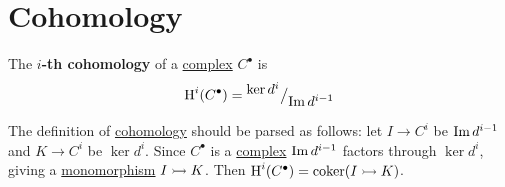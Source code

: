 \documentclass[../../../main]{subfiles}
\begin{document}
\section{Cohomology}
\begin{definition}[Cohomology] \label{def:cohomology}
  The \textbf{\(i\)-th cohomology} of a \hyperref[def:complex]{complex} \(C^{\bullet}\) is
  \begin{align*}
    \operatorname{H}^{i}(C^{\bullet}) = {^{\textstyle \ker d^{i}}\big/_{\textstyle \operatorname*{Im} d^{i-1}}}
  \end{align*}
\end{definition}
\begin{remark}
  The definition of \hyperref[def:cohomology]{cohomology} should be parsed as follows: let \(I \to C^{i}\) be \(\operatorname*{Im} d^{i-1}\) and \(K \to C^{i}\) be \(\ker d^{i}\).
  Since \(C^{\bullet}\) is a \hyperref[def:complex]{complex} \(\operatorname*{Im} d^{i-1}\) factors through \(\ker d^{i}\), giving a \hyperref[def:mono-epi-morphism]{monomorphism} \(I \rightarrowtail K\).
  Then \(\operatorname{H}^{i}(C^{\bullet}) = \operatorname*{coker} (I \rightarrowtail K)\).
\end{remark}
\end{document}
